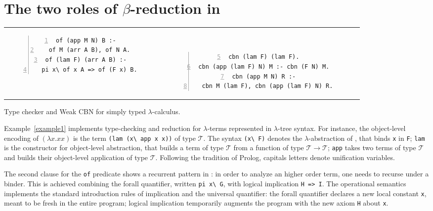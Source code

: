 \documentclass{llncs}
\begin{document}

\section{The two roles of $\beta$-reduction in \lp{}}
\label{sec:beta}

\begin{example}[b]
\begin{center}
\begin{tabular}{cc}
\begin{minipage}{4.8cm}
\begin{Verbatim}[numbers=left,numbersep=1pt,frame=leftline]
of (app M N) B :-
  of M (arr A B), of N A.
of (lam F) (arr A B) :-
  pi x\ of x A => of (F x) B.
\end{Verbatim}
\end{minipage}~~
&
~~~\begin{minipage}{6.5cm}
\begin{Verbatim}[numbers=left,firstnumber=5,numbersep=1pt,frame=leftline]
cbn (lam F) (lam F).
cbn (app (lam F) N) M :- cbn (F N) M.
cbn (app M N) R :-
  cbn M (lam F), cbn (app (lam F) N) R.
\end{Verbatim}
\end{minipage}
\end{tabular}
\end{center}
\caption{\label{example1} Type checker and Weak CBN for simply typed $\lambda$-calculus.}
\end{example}

Example~\ref{example1} implements type-checking and
reduction for $\lambda$-terms represented in $\lambda$-tree syntax.
For instance, the object-level encoding of
$(\lambda x.xx)$ is the term
\verb+(lam (x\ app x x))+ of type $\mathcal{T}$.
The syntax \verb+(x\ F)+ denotes
the $\lambda$-abstraction of \lp{}, that binds \verb+x+ in \verb+F+;
\verb+lam+ is the constructor for object-level abstraction, that builds
a term of type $\mathcal{T}$ from a function of type
$\mathcal{T} \to \mathcal{T}$; \verb+app+ takes two terms of
type $\mathcal{T}$ and builds
their object-level application of type $\mathcal{T}$.
Following the tradition of Prolog, capitals letters denote unification
variables.

The second clause for the \verb+of+ predicate shows a recurrent pattern in
\lp: in order to analyze an higher order term, one needs to recurse
under a binder. This is achieved
combining the forall quantifier, written \verb+pi x\ G+, with logical
implication \verb+H => I+. The operational semantics implements the
standard introduction rules of implication and the universal quantifier:
the forall quantifier declares a
new local constant \verb+x+, meant to be fresh in the entire program;
logical implication temporarily
augments the program with the new axiom \verb+H+ about \verb+x+.
\end{document}
